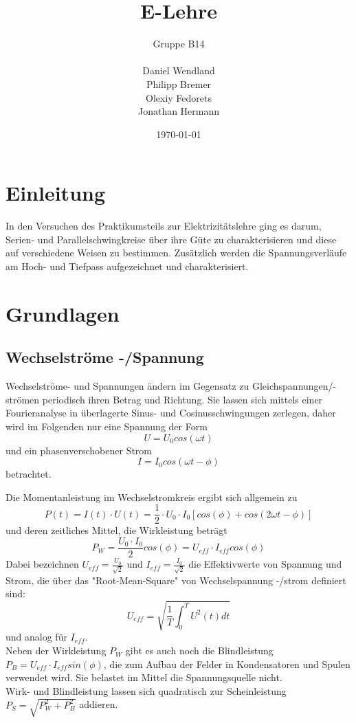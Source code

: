 \documentclass[a4paper, 11pt]{article}
\begin{document}
\title{E-Lehre}
\author{Gruppe B14 \\ \\ Daniel Wendland \\ Philipp Bremer \\ Olexiy Fedorets \\ Jonathan Hermann}
\date{\today}
\maketitle

\newpage

\tableofcontents
\newpage


\section{Einleitung}
In den Versuchen des Praktikumsteils zur Elektrizitätslehre ging es darum, Serien- und Parallelschwingkreise über ihre Güte zu charakterisieren und diese auf verschiedene Weisen zu bestimmen. Zusätzlich werden die Spannungsverläufe am Hoch- und Tiefpass aufgezeichnet und charakterisiert.

\section{Grundlagen}
\subsection{Wechselströme -/Spannung}
Wechselströme- und Spannungen ändern im Gegensatz zu Gleichspannungen/-strömen periodisch ihren Betrag und Richtung. Sie lassen sich mittels einer Fourieranalyse in überlagerte Sinus- und Cosinusschwingungen zerlegen, daher wird im Folgenden nur eine Spannung der Form 
\[ U = U_0 cos( \omega t) \] und ein phasenverschobener Strom \[ I = I_0 cos( \omega t - \phi) \] betrachtet. 

Die Momentanleistung im Wechselstromkreis ergibt sich allgemein zu \[ P(t) = I(t) \cdot U(t) = \frac{1}{2} \cdot U_0 \cdot I_0 [cos(\phi) + cos(2 \omega t - \phi)] \]
und deren zeitliches Mittel, die Wirkleistung beträgt \[P_W = \frac{U_0 \cdot I_0}{2} cos(\phi) = U_{eff} \cdot I_{eff} cos(\phi) \]
Dabei bezeichnen $U_{eff} = \frac{U_0}{\sqrt{2}}$ und $I_{eff} = \frac{I_0}{\sqrt{2}}$ die Effektivwerte von Spannung und Strom, die über das "Root-Mean-Square" von Wechselspannung -/strom definiert sind: \[U_{eff} = \sqrt{ \frac{1}{T} \int_0^T U^2(t) dt}\] und analog für $I_{eff}$. \\
Neben der Wirkleistung $P_W$ gibt es auch noch die Blindleistung $P_B = U_{eff} \cdot I_{eff} sin(\phi)$, die zum Aufbau der Felder in Kondensatoren und Spulen verwendet wird. Sie belastet im Mittel die Spannungsquelle nicht.\\
Wirk- und Blindleistung lassen sich quadratisch zur Scheinleistung $P_S = \sqrt{P_W^2 + P_B^2}$ addieren.
\end{document}
